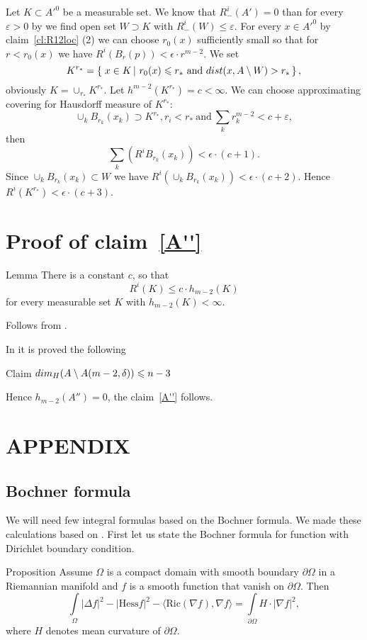 \documentclass[a4paper,10pt]{article}
\begin{document}
Let $K\subset A'^0$ be a measurable set. We know that
$R^i_-(A')=0$ than for every $\varepsilon>0$
 by \cite[2.2.2]{federer} we find open set $W\supset K$ with
$R^i_-(W)\le \varepsilon$.
For every $x\in A'^0$  by claim~\ref{cl:R12loc} (2)
   we can choose $r_0(x)$ sufficiently
small
so that for $r<r_0(x)$ we have
$ R^i(B_{r}(p))<\epsilon\cdot r^{m-2}.$
We set
$$K^{r_*}
=
\set{x\in K}{r_0(x)\le r_*\ \text{and}\  dist(x,A\setminus W)>r_* },$$
obviously
$K=\cup_{r_*}K^{r_*}$. Let $h^{m-2}(K^{r_*})=c<\infty$.
We can choose approximating covering for Hausdorff measure of $K^{r_*}$:
$$\cup_k B_{r_k}(x_k)\supset K^{r_*}, r_i<r_*\  \text{and}\
\sum_k r_k^{m-2}< c+\varepsilon,$$
then $$\sum_k (R^i B_{r_k}(x_k))<\epsilon\cdot(c+1).$$
Since
$\cup_k B_{r_k}(x_k)\subset W$ we have
$R^i(\cup_k B_{r_k}(x_k))<\epsilon\cdot(c+2)$.
Hence $R^i(K^{r_*})<\epsilon\cdot(c+3)$.

\section{Proof of claim~\ref{A''}}\label{sec:codim3}

\begin{thm} {Lemma}
There is a constant $c$, so that
$$R^i(K)\le c\cdot h_{m-2}(K)$$ for every
measurable set $K$ with $h_{m-2}(K)<\infty$.
\end{thm}

Follows from \cite[???]{petrunin-SC}.
\qeds

In \cite{BGP} it is proved the following
\begin{thm}{Claim}
$dim_H(A\setminus A(m-2,\delta) )\leqslant n-3$
\end{thm}
Hence $h_{m-2}(A'')=0$, the claim~\ref{A''} follows.

\section{APPENDIX}
\subsection{Bochner formula}


We will need few integral formulas based on the Bochner formula.
We made these calculations based on \cite[Chapter II]{lawson-michelsohn}.
First let us state the Bochner formula for function with Dirichlet boundary condition.

\begin{thm}{Proposition}\label{prop:bochner-dirichle-old}
Assume $\Omega$ is a compact domain with smooth boundary $\partial \Omega$ in a Riemannian manifold
and $f$ is a smooth function that vanish on $\partial \Omega$.
Then
\[\int\limits_\Omega |\Delta f|^2
-|\mathrm{Hess}f|^2
-\langle\mathrm{Ric}(\nabla f),\nabla f\rangle
=\int\limits_{\partial\Omega}
H\cdot|\nabla f|^2,\]
where $H$ denotes mean curvature of $\partial \Omega$.
\end{thm}
 
\end{document}
